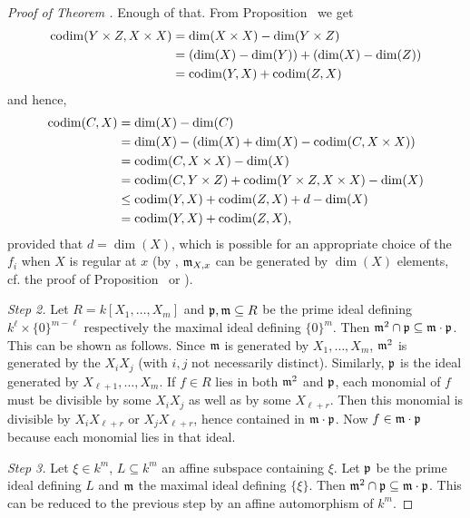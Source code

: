 \documentclass[a4paper,parskip=half,numbers=enddot, DIV=12]{scrreprt}
\begin{document}
\begin{proof}[Proof of Theorem ]
    Enough of that. From Proposition~ we get
    \begin{align*}
    	\operatorname{codim}(Y\times Z,X\times X)&=\dim(X\times X)-\dim(Y\times Z)\\
    	&=(\dim (X)-\dim (Y))+(\dim (X)-\dim (Z))\\
    	&=\operatorname{codim}(Y,X)+\operatorname{codim}(Z,X)
    \end{align*}
    and hence, 
    \begin{align*}
        \operatorname{codim}(C,X)& = \dim(X) -\dim(C)\\
        &= \dim (X) - (\dim(X)+\dim(X) -\operatorname{codim}(C,X\times X))\\
        &= \operatorname{codim}(C,X\times X) -\dim (X)\\
        &=\operatorname{codim}(C,Y\times Z)+\operatorname{codim}(Y\times Z,X\times X)-\dim (X)\\
        &\leq \operatorname{codim}(Y,X) +\operatorname{codim}(Z,X) +d-\dim(X) \\
        &=\operatorname{codim}(Y,X) +\operatorname{codim}(Z,X),
    \end{align*}
    provided that $d=\dim(X)$, which is possible for an appropriate choice of the $f_i$ when $X$ is regular at $x$ (by \NAK, $\mathfrak{m}_{X,x}$ can be generated by $\dim (X)$ elements, cf. the proof of Proposition~ or \cite[Concluding remarks, Lemma~1]{alg1}).
    
    \emph{Step 2.} Let $R= k[X_1,\ldots, X_m]$ and $\mathfrak{p},\mathfrak{m}\subseteq R$ be the prime ideal defining $k^\ell \times \{0\}^{m-\ell}$ respectively the maximal ideal defining $\{0\}^m$. Then $\mathfrak{m}^2 \cap \mathfrak{p} \subseteq \mathfrak{m}\cdot\mathfrak{p}$. This can be shown as follows. Since $\mathfrak{m}$ is generated by $X_1,\ldots,X_m$, $\mathfrak{m}^2$ is generated by the $X_iX_j$ (with $i,j$ not necessarily distinct). Similarly, $\mathfrak{p}$ is the ideal generated by $X_{\ell+1},\ldots, X_m$. If $f\in R$ lies in both $\mathfrak{m}^2$ and $\mathfrak{p}$, each monomial of $f$ must be divisible by some $X_iX_j$ as well as by some $X_{\ell+r}$. Then this monomial is divisible by $X_iX_{\ell+r}$ or $X_jX_{\ell+r}$, hence contained in $\mathfrak{m}\cdot\mathfrak{p}$. Now $f\in\mathfrak{m}\cdot\mathfrak{p}$ because each monomial lies in that ideal.
       
   \emph{Step 3.} Let $\xi\in k^m$, $L\subseteq k^m$ an affine subspace containing $\xi$. Let $\mathfrak{p}$ be the prime ideal defining $L$ and $\mathfrak{m}$ the maximal ideal defining $\{\xi\}$. Then $\mathfrak{m}^2 \cap\mathfrak{p} \subseteq \mathfrak{m}\cdot \mathfrak{p}$. This can be reduced to the previous step by an affine automorphism of $k^m$.
    

\end{proof}
\end{document}
